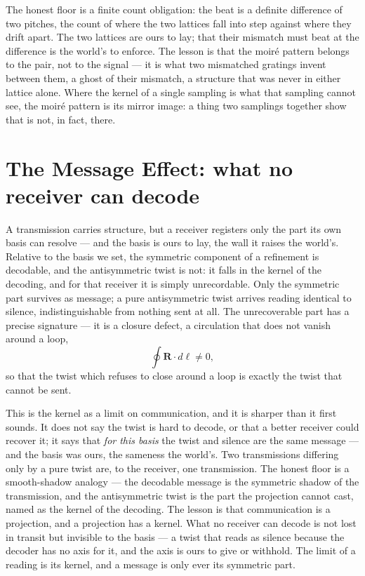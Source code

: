 The honest floor is a finite count obligation: the beat is a definite difference of two pitches, the count of
where the two lattices fall into step against where they drift apart. The two lattices are ours to lay; that
their mismatch must beat at the difference is the world's to enforce. The lesson is that the moir\'e pattern
belongs to the pair, not to the signal --- it is what two mismatched gratings invent between them, a ghost of
their mismatch, a structure that was never in either lattice alone. Where the kernel of a single sampling is
what that sampling cannot see, the moir\'e pattern is its mirror image: a thing two samplings together show
that is not, in fact, there.

\section{The Message Effect: what no receiver can decode}
\label{se:message}

A transmission carries structure, but a receiver registers only the part its own basis can resolve --- and the
basis is ours to lay, the wall it raises the world's. Relative to the basis we set, the symmetric component of
a refinement is decodable, and the antisymmetric twist is not: it falls in the kernel of the decoding, and for
that receiver it is simply unrecordable. Only the symmetric part survives as message; a pure antisymmetric
twist arrives reading identical to silence, indistinguishable from nothing sent at all. The unrecoverable part
has a precise signature --- it is a closure defect, a circulation that does not vanish around a loop,
\begin{equation}
  \oint \mathbf{R}\cdot d\boldsymbol{\ell} \neq 0,
\end{equation}
so that the twist which refuses to close around a loop is exactly the twist that cannot be sent.

This is the kernel as a limit on communication, and it is sharper than it first sounds. It does not say the
twist is hard to decode, or that a better receiver could recover it; it says that \emph{for this basis} the
twist and silence are the same message --- and the basis was ours, the sameness the world's. Two transmissions
differing only by a pure twist are, to the receiver, one transmission. The honest floor is a smooth-shadow
analogy --- the decodable message is the symmetric shadow of the transmission, and the antisymmetric twist is
the part the projection cannot cast, named as the kernel of the decoding. The lesson is that communication is a
projection, and a projection has a kernel. What no receiver can decode is not lost in transit but invisible to
the basis --- a twist that reads as silence because the decoder has no axis for it, and the axis is ours to
give or withhold. The limit of a reading is its kernel, and a message is only ever its symmetric part.

